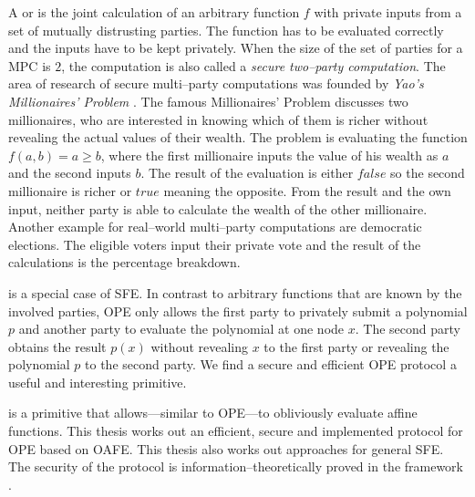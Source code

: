 \label{sec:introduction}

A  or  is the joint calculation of an arbitrary function $f$ with
private inputs from a set of mutually distrusting parties. The function has to
be evaluated correctly and the inputs have to be kept privately.  When the size
of the set of parties for a MPC is $2$, the computation is also called a
\emph{secure two--party computation}. The area of research of secure
multi--party computations was founded by \emph{Yao's Millionaires' Problem}
\cite{yao82}. The famous Millionaires' Problem discusses two millionaires, who
are interested in knowing which of them is richer without revealing the actual
values of their wealth. The problem is evaluating the function $f(a, b) = a \geq
b$, where the first millionaire inputs the value of his wealth as $a$ and the
second inputs $b$. The result of the evaluation is either $false$ so the second
millionaire is richer or $true$ meaning the opposite. From the result and the
own input, neither party is able to calculate the wealth of the other
millionaire. Another example for real--world multi--party computations are
democratic elections. The eligible voters input their private vote and the
result of the calculations is the percentage breakdown.

 \cite{naor99,naor06} is a special
case of SFE. In contrast to arbitrary functions that are known by the involved
parties, OPE only allows the first party to privately submit a polynomial $p$
and another party to evaluate the polynomial at one node $x$. The second party
obtains the result $p(x)$ without revealing $x$ to the first party or revealing
the polynomial $p$ to the second party. We find a secure and efficient OPE
protocol a useful and interesting primitive.

 \cite{davidgoliath} is a
primitive that allows---similar to OPE---to obliviously evaluate affine
functions. This thesis works out an efficient, secure and implemented protocol
for OPE based on OAFE. This thesis also works out approaches for general SFE.
The security of the protocol is information--theoretically proved in the
 framework \cite{canetti05}.


%
%
\label{sec:related-work}

